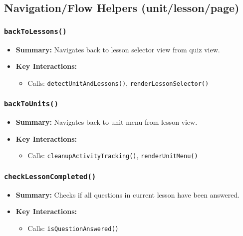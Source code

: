 \documentclass[11pt,letterpaper]{article}
\begin{document}
\subsection{Navigation/Flow Helpers (unit/lesson/page)}

\subsubsection{\texttt{backToLessons()}}
\begin{itemize}
    \item \textbf{Summary:} Navigates back to lesson selector view from quiz view.
    \item \textbf{Key Interactions:}
    \begin{itemize}
        \item Calls: \texttt{detectUnitAndLessons()}, \texttt{renderLessonSelector()}
    \end{itemize}
\end{itemize}

\subsubsection{\texttt{backToUnits()}}
\begin{itemize}
    \item \textbf{Summary:} Navigates back to unit menu from lesson view.
    \item \textbf{Key Interactions:}
    \begin{itemize}
        \item Calls: \texttt{cleanupActivityTracking()}, \texttt{renderUnitMenu()}
    \end{itemize}
\end{itemize}

\subsubsection{\texttt{checkLessonCompleted()}}
\begin{itemize}
    \item \textbf{Summary:} Checks if all questions in current lesson have been answered.
    \item \textbf{Key Interactions:}
    \begin{itemize}
        \item Calls: \texttt{isQuestionAnswered()}
    \end{itemize}
\end{itemize}
\end{document}
